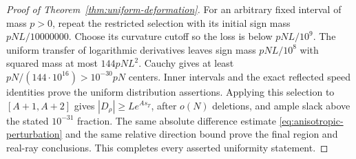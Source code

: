 \begin{proof}[Proof of Theorem~\ref{thm:uniform-deformation}]
For an arbitrary fixed interval of mass $p>0$, repeat the restricted
selection with its initial sign mass $pNL/10000000$.
Choose its curvature cutoff so the loss is below $pNL/10^9$.
The uniform transfer of logarithmic derivatives leaves sign mass
$pNL/10^8$ with squared mass at most $144pNL^2$.
Cauchy gives at least $pN/(144\cdot10^{16})>10^{-30}pN$ centers.
Inner intervals and the exact reflected speed identities prove the
uniform distribution assertions. Applying this selection to
$[A+1,A+2]$ gives $|D_\rho|\ge Le^{As_T}$, after $o(N)$
deletions, and ample slack above the stated $10^{-31}$ fraction.
The same absolute difference estimate
\eqref{eq:anisotropic-perturbation} and the same relative direction
bound prove the final region and real-ray conclusions. This
completes every asserted uniformity statement.
\end{proof}

